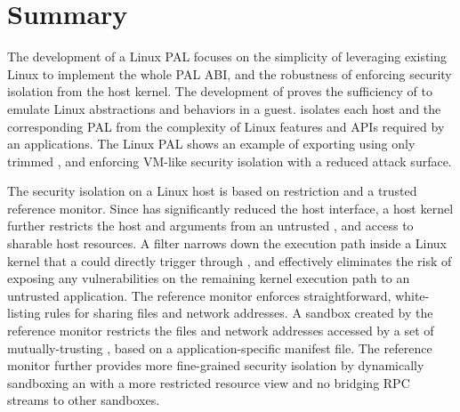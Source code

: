 \section{Summary}


The development of a Linux PAL focuses
on the simplicity of leveraging existing Linux \linuxapis{} to implement
the whole PAL ABI,
and the robustness of enforcing security isolation
from the host kernel.
The development of \thelibos{} proves the sufficiency of \thehostabi{} to emulate Linux abstractions and behaviors in a guest.
\Thehostabi{} isolates each host
and the corresponding PAL
from the complexity of Linux features and APIs required by an applications.
The Linux PAL
shows an example of exporting \thehostabi{} using only \hostsyscallnum{} trimmed \linuxapis{},
and enforcing VM-like security isolation
with a reduced attack surface.


The security isolation on a Linux host is based on \linuxapi{} restriction and a trusted reference monitor.
Since \thelibos{} has significantly reduced the host interface,
a host kernel further restricts the host \linuxapis{} and arguments from an untrusted \picoproc{},
and access to sharable host resources.
A \seccomp{} filter
narrows down the execution path inside a Linux kernel that a \picoproc{} could directly trigger through \linuxapis{},
and effectively eliminates
the risk of exposing any vulnerabilities on the remaining kernel execution path to an untrusted application.
The reference monitor enforces straightforward, white-listing rules
for sharing files and network addresses.
A sandbox created by the reference monitor restricts
the files and network addresses accessed by a set of mutually-trusting \picoproc{}, based on a application-specific manifest file.
The reference monitor further provides more fine-grained security isolation
by dynamically sandboxing an \picoproc{}
with a more restricted resource view and no bridging RPC streams to other sandboxes.





